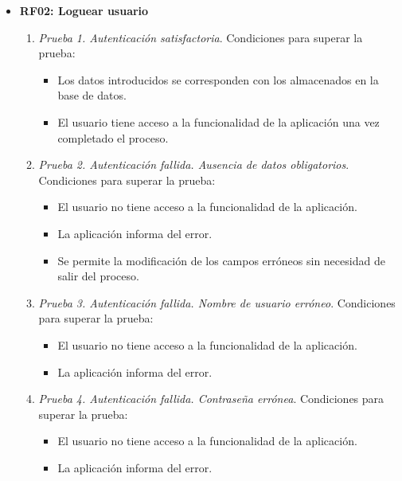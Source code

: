 \begin{itemize}
	\item \textbf{RF02: Loguear usuario}
	\begin{enumerate}
		\item \textit{Prueba 1. Autenticación satisfactoria}. Condiciones para superar la prueba:
		\begin{itemize}
			\item Los datos introducidos se corresponden con los almacenados en la base de datos.
			\item El usuario tiene acceso a la funcionalidad de la aplicación una vez completado el proceso.
		\end{itemize}
		\item \textit{Prueba 2. Autenticación fallida. Ausencia de datos obligatorios}. Condiciones para superar la prueba:
		\begin{itemize}
			\item El usuario no tiene acceso a la funcionalidad de la aplicación.
			\item La aplicación informa del error.
			\item Se permite la modificación de los campos erróneos sin necesidad de salir del proceso.
		\end{itemize}
		\item \textit{Prueba 3. Autenticación fallida. Nombre de usuario erróneo}. Condiciones para superar la prueba:
		\begin{itemize}
			\item El usuario no tiene acceso a la funcionalidad de la aplicación.
			\item La aplicación informa del error.
		\end{itemize}
		\item \textit{Prueba 4. Autenticación fallida. Contraseña errónea}. Condiciones para superar la prueba:
		\begin{itemize}
			\item El usuario no tiene acceso a la funcionalidad de la aplicación.
			\item La aplicación informa del error.
		\end{itemize}
	\end{enumerate}
	

\end{itemize}
